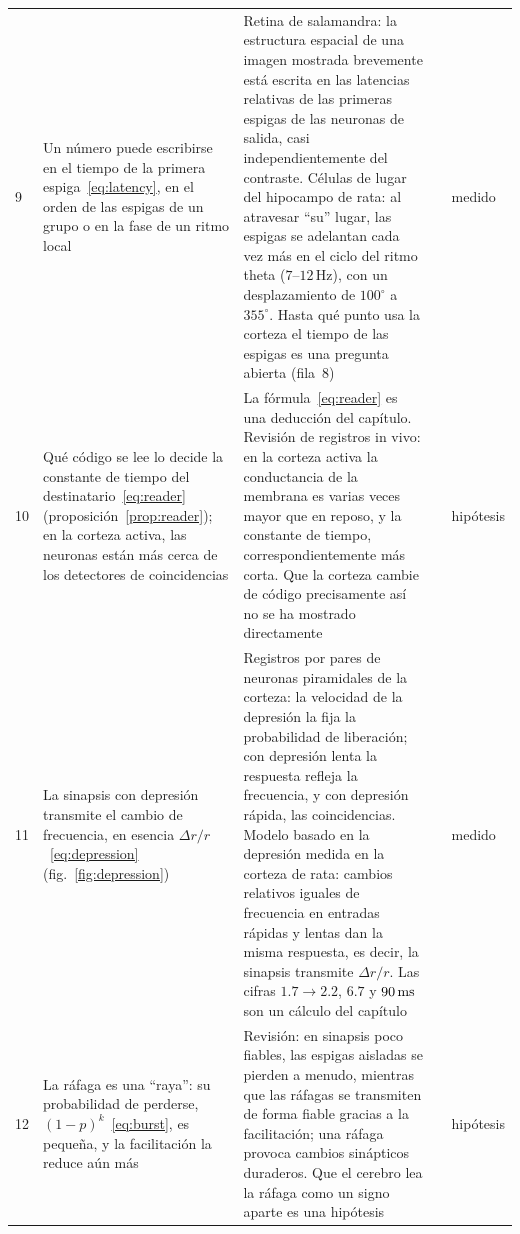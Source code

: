 {\begin{longtable}{>{\raggedright}p{0.5cm}>{\raggedright}p{4.0cm}>{\raggedright}p{5.6cm}>{\raggedright}p{2.3cm}>{\raggedright\arraybackslash}p{1.7cm}}
9 & Un número puede escribirse en el tiempo de la primera espiga~\eqref{eq:latency}, en el orden de las espigas de un grupo o en la fase de un ritmo local & Retina de salamandra: la estructura espacial de una imagen mostrada brevemente está escrita en las latencias relativas de las primeras espigas de las neuronas de salida, casi independientemente del contraste. Células de lugar del hipocampo de rata: al atravesar “su” lugar, las espigas se adelantan cada vez más en el ciclo del ritmo theta ($7$--$12$\,Hz), con un desplazamiento de $100^\circ$ a $355^\circ$. Hasta qué punto usa la corteza el tiempo de las espigas es una pregunta abierta (fila~8) & \cite{Gollisch2008,OKeefe1993} & medido \\
10 & Qué código se lee lo decide la constante de tiempo del destinatario~\eqref{eq:reader} (proposición~\ref{prop:reader}); en la corteza activa, las neuronas están más cerca de los detectores de coincidencias & La fórmula~\eqref{eq:reader} es una deducción del capítulo. Revisión de registros in vivo: en la corteza activa la conductancia de la membrana es varias veces mayor que en reposo, y la constante de tiempo, correspondientemente más corta. Que la corteza cambie de código precisamente así no se ha mostrado directamente & \cite{Destexhe2003} & hipótesis \\
11 & La sinapsis con depresión transmite el cambio de frecuencia, en esencia $\Delta r/r$~\eqref{eq:depression} (fig.~\ref{fig:depression}) & Registros por pares de neuronas piramidales de la corteza: la velocidad de la depresión la fija la probabilidad de liberación; con depresión lenta la respuesta refleja la frecuencia, y con depresión rápida, las coincidencias. Modelo basado en la depresión medida en la corteza de rata: cambios relativos iguales de frecuencia en entradas rápidas y lentas dan la misma respuesta, es decir, la sinapsis transmite $\Delta r/r$. Las cifras $1.7\to2.2$, $6.7$ y $90\,\text{ms}$ son un cálculo del capítulo & \cite{Tsodyks1997,Abbott1997depression} & medido \\
12 & La ráfaga es una “raya”: su probabilidad de perderse, $(1-p)^k$~\eqref{eq:burst}, es pequeña, y la facilitación la reduce aún más & Revisión: en sinapsis poco fiables, las espigas aisladas se pierden a menudo, mientras que las ráfagas se transmiten de forma fiable gracias a la facilitación; una ráfaga provoca cambios sinápticos duraderos. Que el cerebro lea la ráfaga como un signo aparte es una hipótesis & \cite{Lisman1997,AllenStevens1994} & hipótesis \\

\end{longtable}}
